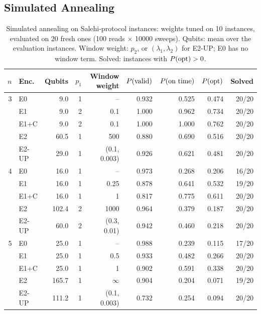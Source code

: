 \subsection{Simulated Annealing}\label{sec:res-sa}
\begin{table}[t]
\caption{Simulated annealing on Salehi-protocol instances: weights tuned on 10 instances,
evaluated on 20 fresh ones (100 reads $\times$ 10000 sweeps). Qubits: mean over the evaluation
instances. Window weight: $p_2$, or $(\lambda_1,\lambda_2)$ for E2-UP; E0 has no window term.
Solved: instances with $P(\mathrm{opt}) > 0$.}\label{tab:sa}
\centering\small\setlength{\tabcolsep}{3pt}
\begin{tabular}{rlrrrrrrr}
\toprule
$n$ & Enc. & Qubits & $p_1$ & Window weight & $P(\mathrm{valid})$ & $P(\text{on time})$ & $P(\mathrm{opt})$ & Solved\\
\midrule
3 & E0    &   9.0 & 1 & --             & 0.932 & 0.525 & 0.474 & 20/20\\
  & E1    &   9.0 & 2 & 0.1            & 1.000 & 0.962 & 0.734 & 20/20\\
  & E1+C  &   9.0 & 2 & 0.1            & 1.000 & 1.000 & 0.762 & 20/20\\
  & E2    &  60.5 & 1 & 500            & 0.880 & 0.690 & 0.516 & 20/20\\
  & E2-UP &  29.0 & 1 & (0.1, 0.003)   & 0.926 & 0.621 & 0.481 & 20/20\\
\midrule
4 & E0    &  16.0 & 1 & --             & 0.973 & 0.268 & 0.206 & 16/20\\
  & E1    &  16.0 & 1 & 0.25           & 0.878 & 0.641 & 0.532 & 19/20\\
  & E1+C  &  16.0 & 1 & 1              & 0.817 & 0.775 & 0.611 & 20/20\\
  & E2    & 102.4 & 2 & 1000           & 0.964 & 0.379 & 0.187 & 20/20\\
  & E2-UP &  60.0 & 2 & (0.3, 0.01)    & 0.942 & 0.460 & 0.218 & 20/20\\
\midrule
5 & E0    &  25.0 & 1 & --             & 0.988 & 0.239 & 0.115 & 17/20\\
  & E1    &  25.0 & 1 & 0.5            & 0.933 & 0.482 & 0.266 & 20/20\\
  & E1+C  &  25.0 & 1 & 1              & 0.902 & 0.591 & 0.338 & 20/20\\
  & E2    & 165.7 & 1 & $\infty$       & 0.904 & 0.204 & 0.071 & 19/20\\
  & E2-UP & 111.2 & 1 & (0.1, 0.003)   & 0.732 & 0.254 & 0.094 & 20/20\\
\bottomrule
\end{tabular}
\end{table}
